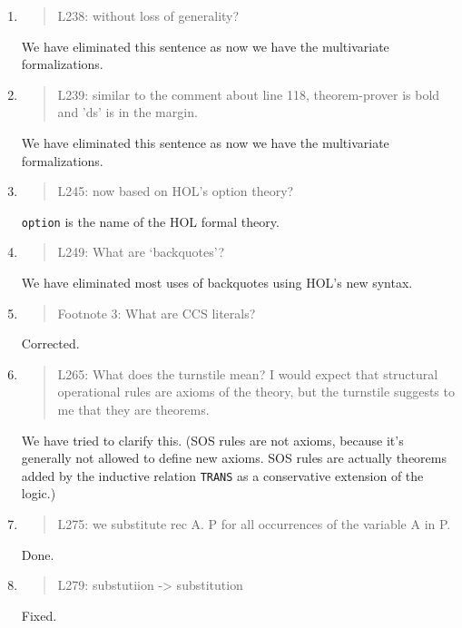 \begin{enumerate}
\item \begin{quote}
    L238: without loss of generality?
  \end{quote}
  We have eliminated this sentence as now we have  the
  multivariate formalizations.
  
\item \begin{quote}
    L239: similar to the comment about line 118, theorem-prover is
    bold and 'ds' is in the margin.
  \end{quote}
  We have eliminated this sentence as now we have  the
  multivariate formalizations.
  
\item \begin{quote}
    L245: now based on HOL’s option theory?
  \end{quote}
  \texttt{option} is the name of the HOL formal theory.
  
\item \begin{quote}
    L249: What are ‘backquotes’?
  \end{quote}
  We have eliminated most uses of backquotes using HOL's new syntax.
  
\item \begin{quote}
    Footnote 3: What are CCS literals?
  \end{quote}
Corrected.
  
\item \begin{quote}
    L265: What does the turnstile mean? I would expect that structural
    operational rules are axioms of the theory, but the turnstile
    suggests to me that they are theorems.
  \end{quote}
  We have tried to  clarify this. 
(SOS rules are  not axioms, because it's
  generally not allowed to define new axioms. SOS rules are actually
 theorems added by the inductive relation \texttt{TRANS} as a
  conservative extension of the logic.)
  
\item \begin{quote}
    L275: we substitute rec A. P for all occurrences of the variable A in P.
  \end{quote}
  Done.
  
\item \begin{quote}
    L279: substutiion -> substitution
  \end{quote}
  Fixed.
  

\end{enumerate}
